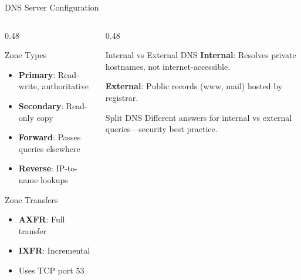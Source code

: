 \documentclass[aspectratio=169]{beamer}  %
\begin{document}
\begin{frame}{DNS Server Configuration}
    \begin{columns}[T]
        \begin{column}{0.48\textwidth}
            \begin{block}{Zone Types}
                \small
                \begin{itemize}\setlength{\itemsep}{1pt}
                    \item \textbf{Primary}: Read-write, authoritative
                    \item \textbf{Secondary}: Read-only copy
                    \item \textbf{Forward}: Passes queries elsewhere
                    \item \textbf{Reverse}: IP-to-name lookups
                \end{itemize}
            \end{block}
            
            \vspace{0.2em}
            \begin{block}{Zone Transfers}
                \small
                \begin{itemize}\setlength{\itemsep}{1pt}
                    \item \textbf{AXFR}: Full transfer
                    \item \textbf{IXFR}: Incremental
                    \item Uses TCP port 53
                \end{itemize}
            \end{block}
        \end{column}
        \begin{column}{0.48\textwidth}
            \begin{block}{Internal vs External DNS}
                \small
                \textbf{Internal}: Resolves private hostnames, not internet-accessible.
                
                \vspace{0.2em}
                \textbf{External}: Public records (www, mail) hosted by registrar.
            \end{block}
            
            \vspace{0.2em}
            \begin{alertblock}{Split DNS}
                \small
                Different answers for internal vs external queries---security best practice.
            \end{alertblock}
            

\end{column}
\end{columns}
\end{frame}
\end{document}
